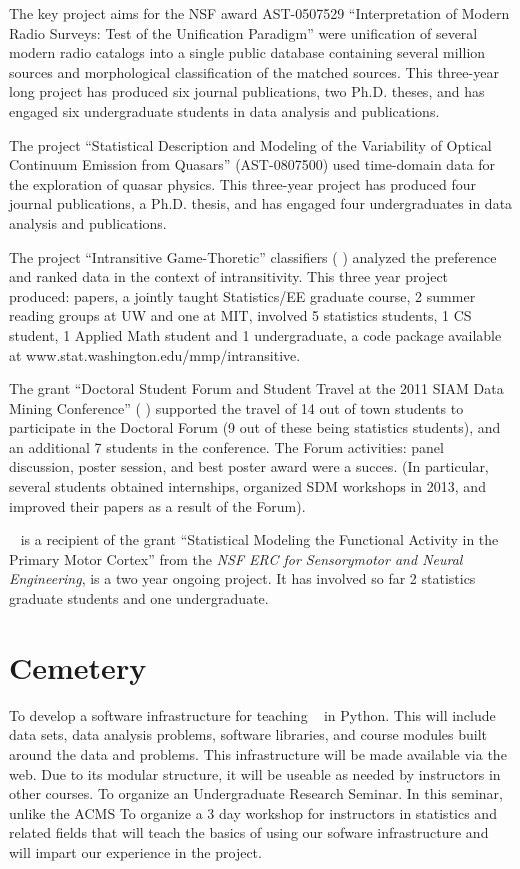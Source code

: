 The key project aims for the NSF award AST-0507529 ``Interpretation of Modern Radio 
Surveys: Test of the Unification Paradigm'' were unification of several modern radio 
catalogs into a single public database containing several million sources and 
morphological classification of the matched sources. This three-year long project has 
produced six journal publications, two Ph.D. theses, and has engaged six undergraduate 
students in data analysis and publications. 

The project ``Statistical Description and Modeling of the Variability of Optical Continuum 
Emission from Quasars'' (AST-0807500) used time-domain data for the exploration of quasar 
physics. This three-year project has produced four journal publications, a Ph.D. thesis, and has 
engaged four undergraduates in data analysis and publications. 

The project ``Intransitive Game-Thoretic'' classifiers ( )  analyzed the preference and ranked data in the context of intransitivity. This three year project produced:  papers, a jointly taught Statistics/EE graduate course, 2 summer reading groups at UW and one at MIT, involved 5 statistics students, 1 CS student, 1 Applied Math student and 1 undergraduate, a code package available at {www.stat.washington.edu/mmp/intransitive}.

The grant ``Doctoral Student Forum and Student Travel at the 2011 SIAM Data Mining Conference'' ( ) supported the travel of 14 out of town students to participate in the Doctoral Forum (9 out of these being statistics students), and an additional 7 students in the conference. The Forum activities: panel discussion, poster session, and best poster award were a succes. (In particular, several students obtained internships, organized SDM workshops in 2013, and improved their papers as a result of the Forum). 

\meila~ is a recipient of the grant ``Statistical Modeling the Functional Activity in the Primary Motor Cortex''  from the {\em NSF ERC for Sensorymotor and Neural Engineering}, is a two year ongoing project. It has involved so far 2 statistics graduate students and one undergraduate. 



\section{Cemetery}

To develop a software infrastructure for teaching \cdse~ in
  Python. This will include data sets, data analysis problems,
  software libraries, and course modules built around the data and
  problems. This infrastructure will be made available via the
  web. Due to its modular structure, it will be useable as needed by
  instructors in other courses.
 To organize an Undergraduate Research Seminar. In this seminar, unlike the ACMS 
 To organize a 3 day workshop for instructors in statistics and related fields that will teach the basics of using our sofware infrastructure and will impart our experience in the project.



